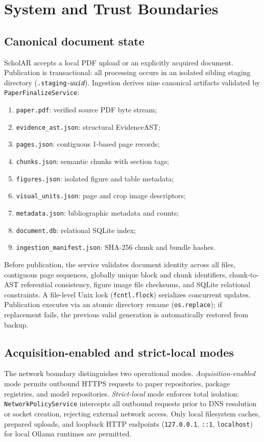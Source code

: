 \section{System and Trust Boundaries}
\subsection{Canonical document state}
ScholAR accepts a local PDF upload or an explicitly acquired document. Publication is transactional: all processing occurs in an isolated sibling staging directory (\texttt{.staging-\textit{uuid}}). Ingestion derives nine canonical artifacts validated by \texttt{PaperFinalizeService}:
\begin{enumerate}
    \setlength{\itemsep}{0pt}\setlength{\parskip}{0pt}
    \item \texttt{paper.pdf}: verified source PDF byte stream;
    \item \texttt{evidence\_ast.json}: structural EvidenceAST;
    \item \texttt{pages.json}: contiguous 1-based page records;
    \item \texttt{chunks.json}: semantic chunks with section tags;
    \item \texttt{figures.json}: isolated figure and table metadata;
    \item \texttt{visual\_units.json}: page and crop image descriptors;
    \item \texttt{metadata.json}: bibliographic metadata and counts;
    \item \texttt{document.db}: relational SQLite index;
    \item \texttt{ingestion\_manifest.json}: SHA-256 chunk and bundle hashes.
\end{enumerate}
Before publication, the service validates document identity across all files, contiguous page sequences, globally unique block and chunk identifiers, chunk-to-AST referential consistency, figure image file checksums, and SQLite relational constraints. A file-level Unix lock (\texttt{fcntl.flock}) serializes concurrent updates. Publication executes via an atomic directory rename (\texttt{os.replace}); if replacement fails, the previous valid generation is automatically restored from backup.

\subsection{Acquisition-enabled and strict-local modes}
The network boundary distinguishes two operational modes. \emph{Acquisition-enabled} mode permits outbound HTTPS requests to paper repositories, package registries, and model repositories. \emph{Strict-local} mode enforces total isolation: \texttt{NetworkPolicyService} intercepts all outbound requests prior to DNS resolution or socket creation, rejecting external network access. Only local filesystem caches, prepared uploads, and loopback HTTP endpoints (\texttt{127.0.0.1}, \texttt{::1}, \texttt{localhost}) for local Ollama runtimes are permitted.

